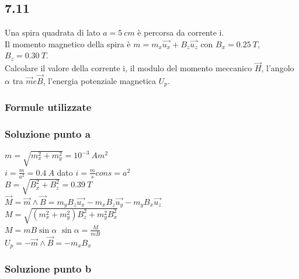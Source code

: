 \documentclass[../../main.tex]{subfiles}
\begin{document}
\subsection*{7.11}
Una spira quadrata di lato $a = 5\ cm$ è percorsa da corrente i.
\\Il momento magnetico della spira è $m = m_x\vec{u_x}+B_z\vec{u_z}$ con $ B_x = 0.25\ T$, $B_z=0.30\ T$.
\\Calcolare il valore della corrente i, il modulo del momento meccanico $\vec{H}$, l'angolo $\alpha$ tra $\vec{m} e \vec{B}$, l'energia potenziale magnetica $U_p$.
\subsubsection*{Formule utilizzate}
\subsubsection*{Soluzione punto a}
$m = \sqrt{m_x^2+m_y^2}= 10^{-3}\ Am^2$
\\$i = \frac{m}{a^2} = 0.4\ A$ dato $i = \frac{m}{s} con s= a^2$
\\$B = \sqrt{B_x^2+B_z^2}=0.39\ T$
\\$\vec{M} = \vec{m}\wedge\vec{B} = m_yB_z\vec{u_x}-m_xB_z\vec{u_y}-m_yB_x\vec{u_z}$
\\$M = \sqrt{\left(m_x^2+m_y^2\right)B_z^2+m_y^2B_x^2}$
\\$M = mB\sin\alpha$   $\sin\alpha = \frac{M}{mB}$
\\$U_p = -\vec{m}\wedge\vec{B} = -m_xB_x$
\subsubsection*{Soluzione punto b}
\newpage
\end{document}
